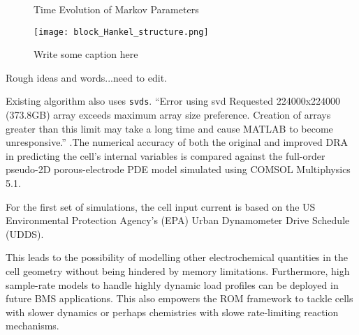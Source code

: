 \begin{figure}[tbp]

\caption{Time Evolution of Markov Parameters}
\label{f:diagram}
\end{figure}

\begin{figure}[!ht]
\centering
\texttt{[image: block\_Hankel\_structure.png]}
\caption{Write some caption here}
\label{random}
\end{figure}

Rough ideas and words...need to edit.

Existing algorithm also uses \texttt{svds}. ``Error using svd Requested
224000x224000 (373.8GB) array exceeds maximum array size preference.
Creation of arrays greater than this limit may take a long time and
cause MATLAB to become unresponsive.''
.The numerical accuracy of both the original and improved DRA in predicting
the cell's internal variables is compared against the full-order pseudo-2D
porous-electrode PDE model simulated using COMSOL Multiphysics 5.1.

For the first set of simulations, the cell input current is based
on the US Environmental Protection Agency's (EPA) Urban Dynamometer
Drive Schedule (UDDS).


This leads to the possibility of modelling other electrochemical quantities
in the cell geometry without being hindered by memory limitations.
Furthermore, high sample-rate models to handle highly dynamic load
profiles can be deployed in future BMS applications. This also empowers
the ROM framework to tackle cells with slower dynamics or perhaps
chemistries with slowe rate-limiting reaction mechanisms.

